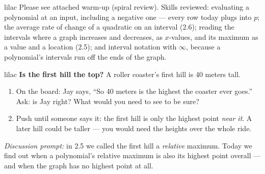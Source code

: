 \documentclass[10pt]{article}
\begin{document}
\begin{skillbox}{lilac}
    Please see attached warm-up (spiral review).
    Skills reviewed: evaluating a polynomial at an input, including a negative one --- every row
    today plugs into $p$; the average rate of change of a quadratic on an interval (2.6); reading
    the intervals where a graph increases and decreases, as $x$-values, and its maximum as a
    value and a location (2.5); and interval notation with $\infty$, because a polynomial's
    intervals run off the ends of the graph.
\end{skillbox}

\begin{skillbox}{lilac}
    \textbf{Is the first hill the top?} A roller coaster's first hill is 40 meters tall.
    \begin{enumerate}[itemsep=2pt]
        \item On the board: Jay says, ``So 40 meters is the highest the coaster ever goes.'' Ask:
              is Jay right? What would you need to see to be sure?
        \item Push until someone says it: the first hill is only the highest point \emph{near
              it}. A later hill could be taller --- you would need the heights over the whole
              ride.
    \end{enumerate}
    \textit{Discussion prompt:} in 2.5 we called the first hill a \emph{relative} maximum. Today
    we find out when a polynomial's relative maximum is also its highest point overall --- and
    when the graph has no highest point at all.
\end{skillbox}
\end{document}
